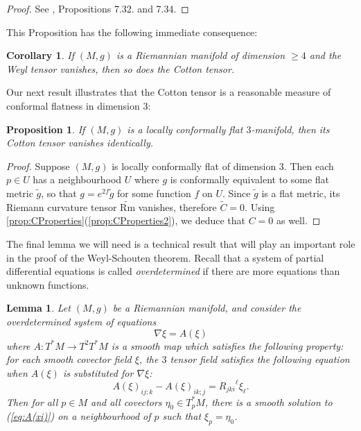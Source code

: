 \documentclass{amsart}
\numberwithin{equation}{section}
\newcommand{\Rm}{\mathrm{Rm}}
\theoremstyle{plain}
\newtheorem{prop}[thm]{Proposition}
\newtheorem{lem}[thm]{Lemma}
\newtheorem{cor}[thm]{Corollary}
\theoremstyle{definition}
\theoremstyle{remark}
\begin{document}
\begin{proof}
 See \cite{LeeRiemannian}, Propositions 7.32. and 7.34.
\end{proof}
This Proposition has the following immediate consequence:
\begin{cor}
    If $(M, g)$ is a Riemannian manifold of dimension $\ge 4$ and the Weyl tensor vanishes, then so does the Cotton tensor.
\end{cor}

Our next result illustrates that the Cotton tensor is a reasonable measure of conformal flatness in dimension $3$:
\begin{prop}\label{prop:conformalC=0}
    If $(M, g)$ is a locally conformally flat $3$-manifold, then its Cotton tensor vanishes identically.
\end{prop}
\begin{proof}
    Suppose $(M, g)$ is locally conformally flat of dimension $3$. Then each $p \in U$ has a neighbourhood $U$ where $g$ is conformally equivalent to some flat metric $\tilde{g}$, so that $g = e^{2f}\tilde{g}$ for some function $f$ on $U$. Since $\tilde{g}$ is a flat metric, its Riemann curvature tensor $\widetilde{\Rm}$ vanishes, therefore $\widetilde{C} = 0$. Using \ref{prop:CProperties}(\ref{prop:CProperties2}), we deduce that $C = 0$ as well.
\end{proof}

The final lemma we will need is a technical result that will play an important role in the proof of the Weyl-Schouten theorem. Recall that a system of partial differential equations is called \emph{overdetermined} if there are more equations than unknown functions.

\begin{lem}\label{lem:overdeterminedSolution}
    Let $(M, g)$ be a Riemannian manifold, and consider the overdetermined system of equations
    \begin{equation} \label{eq:A(xi)}
        \nabla \xi = A(\xi)
    \end{equation}
    where $A: T^*M \to T^2 T^*M$ is a smooth map which satisfies the following property: for each smooth covector field $\xi$, the $3$ tensor field satisfies the following equation when $A(\xi)$ is substituted for $\nabla \xi$:
    \begin{equation}\label{eq:A(xi)relation}
        A(\xi)_{ij;k} - A(\xi)_{ik;j} = {R_{jki}}^\ell \xi_\ell.
    \end{equation}
    Then for all $p \in M$ and all covectors $\eta_0 \in T_p^* M$, there is a smooth solution to (\ref{eq:A(xi)}) on a neighbourhood of $p$ such that $\xi_p = \eta_0$.
\end{lem}
\end{document}
